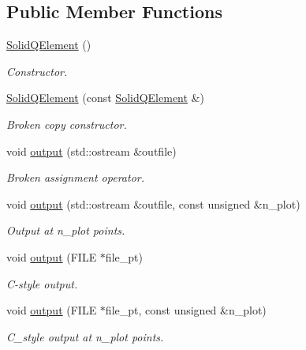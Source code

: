 \subsection*{Public Member Functions}
\begin{DoxyCompactItemize}
\item 
\hyperlink{classoomph_1_1SolidQElement_3_011_00_01NNODE__1D_01_4_a7dfe2bebc8306a8395c35dc890193215}{Solid\+Q\+Element} ()
\begin{DoxyCompactList}\small\item\em Constructor. \end{DoxyCompactList}\item 
\hyperlink{classoomph_1_1SolidQElement_3_011_00_01NNODE__1D_01_4_a898cb4736295a43a4df5e4a12cb694c7}{Solid\+Q\+Element} (const \hyperlink{classoomph_1_1SolidQElement}{Solid\+Q\+Element} \&)
\begin{DoxyCompactList}\small\item\em Broken copy constructor. \end{DoxyCompactList}\item 
void \hyperlink{classoomph_1_1SolidQElement_3_011_00_01NNODE__1D_01_4_aa419f785459467534f9e365dc80383b7}{output} (std\+::ostream \&outfile)
\begin{DoxyCompactList}\small\item\em Broken assignment operator. \end{DoxyCompactList}\item 
void \hyperlink{classoomph_1_1SolidQElement_3_011_00_01NNODE__1D_01_4_af9949cdad7c4cd1a8a9c50385d00ce7f}{output} (std\+::ostream \&outfile, const unsigned \&n\+\_\+plot)
\begin{DoxyCompactList}\small\item\em Output at n\+\_\+plot points. \end{DoxyCompactList}\item 
void \hyperlink{classoomph_1_1SolidQElement_3_011_00_01NNODE__1D_01_4_a48a580c256586164ec6ba559e100eb0f}{output} (F\+I\+LE $\ast$file\+\_\+pt)
\begin{DoxyCompactList}\small\item\em C-\/style output. \end{DoxyCompactList}\item 
void \hyperlink{classoomph_1_1SolidQElement_3_011_00_01NNODE__1D_01_4_aee559383965b0581c287e10d6278050e}{output} (F\+I\+LE $\ast$file\+\_\+pt, const unsigned \&n\+\_\+plot)
\begin{DoxyCompactList}\small\item\em C\+\_\+style output at n\+\_\+plot points. \end{DoxyCompactList}\item 

\end{DoxyCompactItemize}
